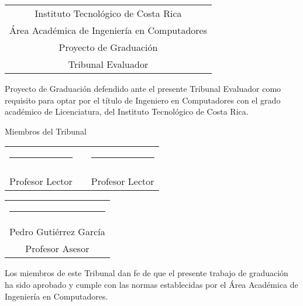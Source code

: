 \thispagestyle{empty}

\newcommand{\lectorI}{}
\newcommand{\lectorII}{}
\newcommand{\director}{Pedro Gutiérrez García}


\begin{center}
  \begin{tabular}{c}
    Instituto Tecnológico de Costa Rica \\
    Área Académica de Ingeniería en Computadores \\
    Proyecto de Graduación \\
    Tribunal Evaluador
  \end{tabular}
\end{center}

\vfill

Proyecto de Graduación defendido ante el presente Tribunal Evaluador como 
requisito para optar por el título de Ingeniero en Computadores con el grado 
académico de Licenciatura, del Instituto Tecnológico de Costa Rica.  

\vfill

\vspace*{20mm}
\begin{center}
 Miembros del Tribunal
\end{center}
\vspace*{8mm}

\vfill

\begin{center}
  \begin{tabular}{ccc}
    \rule{70mm}{0.5pt} & \rule{15mm}{0pt} & \rule{70mm}{0.5pt} \\
    \lectorI && \lectorII \\
    Profesor Lector && Profesor Lector
  \end{tabular}
  
  \vspace{10mm}

  \begin{tabular}{c}
    \rule{6cm}{0.5pt} \\
    \director \\
    Profesor Asesor
  \end{tabular}
\end{center}

\vfill


Los miembros de este Tribunal dan fe de que el presente trabajo de graduación
ha sido aprobado y cumple con las normas establecidas por el Área Académica de Ingeniería en Computadores.

\vfill

\begin{center}
  \spanishplacedate\par
\end{center}


